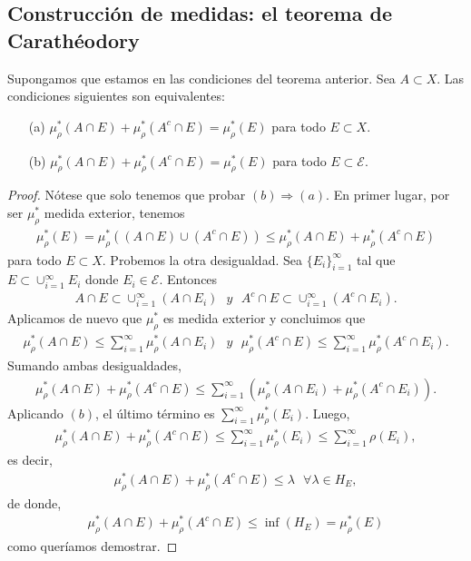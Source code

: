 \subsection{Construcción de medidas: el teorema de Carathéodory}
\begin{teo}
    Supongamos que estamos en las condiciones del teorema anterior. Sea $A \subset X$. Las condiciones siguientes son equivalentes:
    \begin{enumerate}
        \item[(a)] $\mu_{\rho}^*(A \cap E) + \mu_{\rho}^*(A^c \cap E) = \mu_{\rho}^*(E)$ para todo $E \subset X$. \item[(b)] $\mu_{\rho}^*(A \cap E) + \mu_{\rho}^*(A^c \cap E) = \mu_{\rho}^*(E)$ para todo $E \subset \mathcal{E}$.
    \end{enumerate}
\end{teo}

\begin{proof}
    Nótese que solo tenemos que probar $(b) \Longrightarrow (a)$. En primer lugar, por ser $\mu_{\rho}^*$ medida exterior, tenemos
    \begin{align*}
        \mu_{\rho}^*(E) = \mu_{\rho}^*((A \cap E) \cup (A^c \cap E)) \leq \mu_{\rho}^*(A \cap E) + \mu_{\rho}^*(A^c \cap E)
    \end{align*}
    para todo $E \subset X$. Probemos la otra desigualdad. Sea $\{E_i\}_{i=1}^{\infty}$ tal que $E \subset \cup_{i=1}^{\infty}{E_i}$ donde $E_i \in \mathcal{E}$. Entonces
    \begin{align*}
        A \cap E \subset \cup_{i=1}^{\infty}{(A \cap E_i)} \ \ \ y \ \ \ A^c \cap E \subset \cup_{i=1}^{\infty}{(A^c \cap E_i)}.
    \end{align*}
    Aplicamos de nuevo que $\mu_{\rho}^*$ es medida exterior y concluimos que
    \begin{align*}
        \mu_{\rho}^*(A \cap E) \leq \sum_{i=1}^{\infty}{ \mu_{\rho}^*(A \cap E_i)} \ \ \ y \ \ \ \mu_{\rho}^*(A^c \cap E) \leq \sum_{i=1}^{\infty}{ \mu_{\rho}^*(A^c \cap E_i)}.
    \end{align*}
    Sumando ambas desigualdades,
    \begin{align*}
        \mu_{\rho}^*(A \cap E) + \mu_{\rho}^*(A^c \cap E) \leq \sum_{i=1}^{\infty}{( \mu_{\rho}^*(A \cap E_i) + \mu_{\rho}^*(A^c \cap E_i))}.
    \end{align*}
    Aplicando $(b)$, el último término es $\sum_{i=1}^{\infty}{\mu_{\rho}^*(E_i)}$. Luego,
    \begin{align*}
        \mu_{\rho}^*(A \cap E) + \mu_{\rho}^*(A^c \cap E) \leq \sum_{i=1}^{\infty}{\mu_{\rho}^*(E_i)} \leq \sum_{i=1}^{\infty}{\rho(E_i)},
    \end{align*}
    es decir,
    \begin{align*}
        \mu_{\rho}^*(A \cap E) + \mu_{\rho}^*(A^c \cap E) \leq \lambda \ \ \ \forall \lambda \in H_E,
    \end{align*}
    de donde,
    \begin{align*}
        \mu_{\rho}^*(A \cap E) + \mu_{\rho}^*(A^c \cap E) \leq \inf(H_E) = \mu_{\rho}^*(E)
    \end{align*}
    como queríamos demostrar.
\end{proof}

